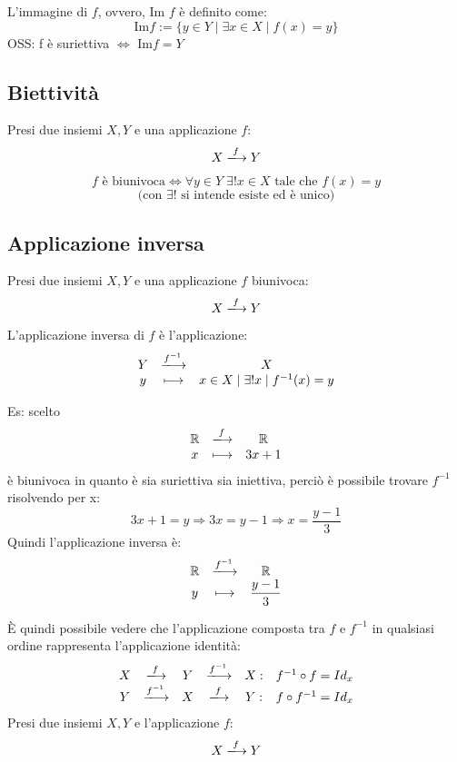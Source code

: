 \documentclass[a4paper,12pt]{article}
\begin{document}
	L'immagine di $f$, ovvero, Im $f$ è definito come: 
	\[
	\text{Im} f:= \{y \in Y \mid \exists x\in X \mid f(x) = y\}
	\]
	OSS: f è suriettiva $\iff$ Im$f = Y$
	\subsection{Biettività}
	Presi due insiemi $X, Y$ e una applicazione $f$:
	\[
	X \xlongrightarrow{f} Y
	\] 
	
	\[
	f \text{ è biunivoca} \iff \forall y \in Y \; \exists! x \in X \text{ tale che } f(x) = y 
	\]
	\[
	\text{(con } \exists! \text{ si intende esiste ed è unico})
	\]
	
	
	\subsection{Applicazione inversa}
	Presi due insiemi $X, Y$ e una applicazione $f$ biunivoca:
	\[
	X \xlongrightarrow{f} Y
	\] 
	
	L'applicazione inversa di $f$ è l'applicazione:
	\[
	\begin{array}{c c c}
		Y & \xlongrightarrow{f^{-1}} & X \\
		y & \longmapsto & x \in X \mid \exists ! x \mid f^{-1}(x) = y
	\end{array}
	\]
	
	Es:
	scelto
	\[
	\begin{array}{c c c}
		\mathbb{R} & \xlongrightarrow{f} & \mathbb{R} \\
		x & \longmapsto & 3x + 1
	\end{array}
	\]
	è biunivoca in quanto è sia suriettiva sia iniettiva, perciò è possibile trovare $f^{-1}$ risolvendo per x:
	\[
	3x + 1 = y \Longrightarrow 3x = y - 1 \Longrightarrow x = \dfrac{y -1}{3}
	\]
	Quindi l'applicazione inversa è:
	\[
	\begin{array}{c c c}
		\mathbb{R} & \xlongrightarrow{f^{-1}} & \mathbb{R} \\
		y & \longmapsto & \dfrac{y -1}{3}
	\end{array}
	\]
	
	È quindi possibile vedere che l'applicazione composta tra $f$ e $f^{-1}$ in qualsiasi ordine rappresenta l'applicazione identità:	
	\[
	\begin{array}{c c c c c c}
		X & \xlongrightarrow{f} & Y & \xlongrightarrow{f^{-1}} & X: & f^{-1} \circ f = Id_x \\
		Y & \xlongrightarrow{f^{-1}} & X & \xlongrightarrow{f} & Y: & f \circ f^{-1} = Id_x
	\end{array}
	\]\newline
	Presi due insiemi $X, Y$ e l'applicazione $f$:
	\[
	X \xlongrightarrow{f} Y
 	\]
 	
\end{document}
